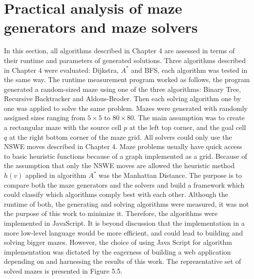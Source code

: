 \section{Practical analysis of maze generators and maze solvers}
In this section, all algorithms described in Chapter 4 are assessed in terms of their runtime and parameters of generated solutions. Three algorithms described
in Chapter 4 were evaluated: Dijkstra, $A^*$ and BFS, each algorithm was tested in the same way. The runtime measurement program worked as follows,
the program generated a random-sized maze using one of the three algorithms: Binary Tree, Recursive Backtracker and Aldous-Broder. Then each solving
algorithm one by one was applied to solve the same problem. Mazes were generated with randomly assigned sizes ranging from $5 \times 5$ to $80 \times 80$.
The main assumption was to create a rectangular maze with the source cell $p$ at the left top corner, and the goal cell $q$ at the right bottom corner of the maze grid. 
All solvers could only use the NSWE moves described in Chapter 4. Maze problems usually have quick access to basic heuristic functions because of
a graph implemented as a grid. Because of the assumption that only the NSWE moves are allowed the heuristic method $h(v)$ applied in algorithm $A^*$ was the
Manhattan Distance.
The purpose is to compare both the maze generators and the solvers and build a framework which could classify which algorithms comply best with each other.
Although the runtime of both, the generating and solving algorithms were measured, it was not the purpose of this work to minimize it. Therefore, the algorithms
were implemented in JavaScript. It is beyond discussion that the implementation in a more low-level language would be more efficient, and could lead to building
and solving bigger mazes. However, the choice of using Java Script for algorithm implementation was dictated by the eagerness of building a web application
depending on and harnessing the results of this work. 
The reprezentative set of solved mazes is presented in Figure 5.5.%
